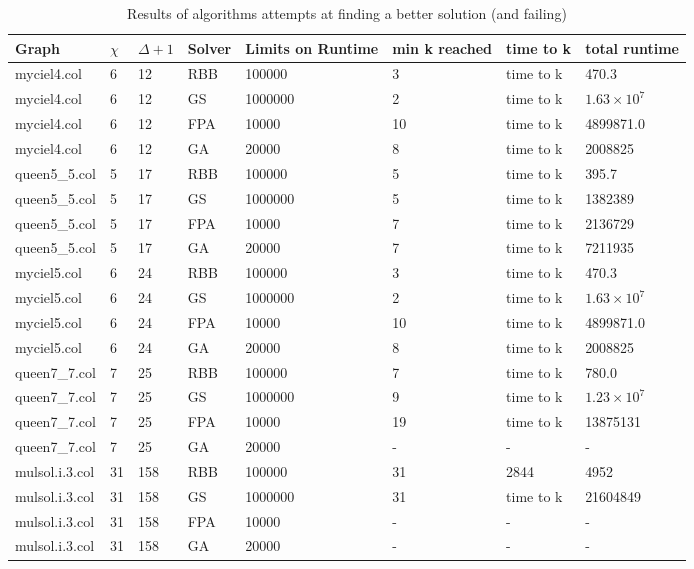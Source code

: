 \begin{table}[H]
\centering
\begin{tabular}{l l l l l l l l}
\hline
Graph & $\chi$ & $\Delta + 1$ & Solver & Limits on Runtime & min k reached & time to k & total runtime \\\hline
myciel4.col & 6 & 12 & RBB & 100000 & 3 & time to k & 470.3\\
myciel4.col & 6 & 12 & GS & 1000000 & 2 & time to k & $1.63 \times 10^7$\\
myciel4.col & 6 & 12 & FPA & 10000 & 10 & time to k & 4899871.0\\
myciel4.col & 6 & 12 & GA & 20000 & 8 & time to k & 2008825\\

queen5\_5.col & 5 & 17 & RBB & 100000 & 5 & time to k & 395.7\\
queen5\_5.col & 5 & 17 & GS & 1000000 & 5 & time to k & 1382389\\
queen5\_5.col & 5 & 17 & FPA & 10000 & 7 & time to k & 2136729\\
queen5\_5.col & 5 & 17 & GA & 20000 & 7 & time to k & 7211935\\

myciel5.col & 6 & 24 & RBB & 100000 & 3 & time to k & 470.3\\
myciel5.col & 6 & 24 & GS & 1000000 & 2 & time to k & $1.63 \times 10^7$\\
myciel5.col & 6 & 24 & FPA & 10000 & 10 & time to k & 4899871.0\\
myciel5.col & 6 & 24 & GA & 20000 & 8 & time to k & 2008825\\

queen7\_7.col & 7 & 25 & RBB & 100000 & 7 & time to k & 780.0\\
queen7\_7.col & 7 & 25 & GS & 1000000 & 9 & time to k & $1.23 \times 10^7$\\
queen7\_7.col & 7 & 25 & FPA & 10000 & 19 & time to k & 13875131\\
queen7\_7.col & 7 & 25 & GA & 20000 & - & - & -\\

mulsol.i.3.col & 31 & 158 & RBB & 100000 & 31 & 2844 & 4952\\
mulsol.i.3.col & 31 & 158 & GS & 1000000 & 31 & time to k & 21604849\\
mulsol.i.3.col & 31 & 158 & FPA & 10000 & - & - & -\\
mulsol.i.3.col & 31 & 158 & GA & 20000 & - & - & -\\

\hline
\end{tabular}
\caption{Results of algorithms attempts at finding a better solution (and failing)}
\label{res:timeToFail}
\end{table}